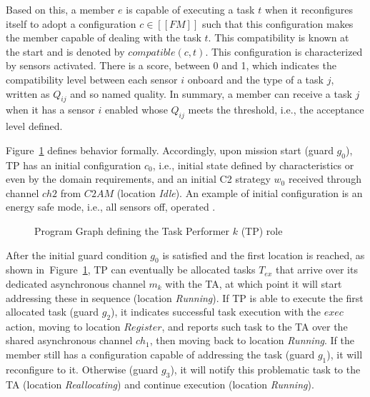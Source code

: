 Based on this, a member $e$ is capable of executing a task $t$ when it reconfigures itself to adopt a configuration $c \in [\![FM]\!]$ such that this configuration makes the member capable of dealing with the task $t$.  This compatibility is known at the start and is denoted by $compatible(c, t)$. This configuration is characterized by sensors activated. There is a score, between 0 and 1, which indicates the compatibility level between each sensor $i$ onboard and the type of a task $j$, written as $Q_{ij}$ and so named quality. In summary, a member can receive a task $j$ when it has a sensor $i$ enabled whose $Q_{ij}$ meets the threshold, i.e., the acceptance level defined.  


Figure~\ref{fig:ex_pg} defines  behavior formally. Accordingly, upon mission start (guard $g_0$), TP has an initial configuration $c_0$, i.e., initial state defined by  characteristics or even by the domain requirements, and an initial C2 strategy $w_0$ received through channel $ch2$ from $C2AM$ (location \textit{Idle}). An example of initial configuration is an energy safe mode, i.e., all sensors off, operated .

\begin{figure}[ht!]
    \centering
    \scalebox{.75}{}
    \caption{Program Graph defining the Task Performer $k$ (TP) role}
    \label{fig:ex_pg}
\end{figure}

After the initial guard condition $g_0$ is satisfied and the first location is reached, as shown in~Figure~\ref{fig:ex_pg}, TP can eventually be allocated tasks $T_{ex}$ that arrive over its dedicated asynchronous channel $m_k$ with the TA, at which point it will start addressing these in sequence (location \textit{Running}). If TP is able to execute the first allocated task (guard $g_2$), it indicates successful task execution with the $exec$ action, moving to location $Register$, and reports such task to the TA over the shared asynchronous channel $ch_1$, then moving back to location \textit{Running}. If the member still has a configuration capable of addressing the task (guard $g_1$), it will reconfigure to it. Otherwise (guard $g_3$), it will notify this problematic task to the TA (location \textit{Reallocating}) and continue execution (location \textit{Running}). 

